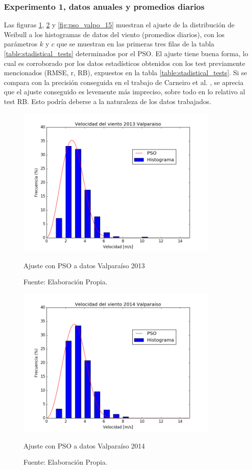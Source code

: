 \subsubsection{Experimento 1, datos anuales y promedios diarios}
Las figuras \ref{fig:pso_valpo_13}, \ref{fig:pso_valpo_14} y \ref{fig:pso_valpo_15} muestran el ajuste de la distribución de Weibull a los histogramas de datos del viento (promedios diarios), con los parámetros $k$ y $c$  que se muestran en las primeras tres filas de la tabla \ref{table:stadistical_tests} determinados por el PSO. El ajuste tiene buena forma, lo cual es corroborado por los datos estadísticos obtenidos con los test previamente mencionados (RMSE, r, RB), expuestos en la tabla \ref{table:stadistical_tests}. Si se compara con la precisión conseguida en el trabajo de Carneiro et al. \cite{Carneiro15}, se aprecia que el ajuste conseguido es levemente más impreciso, sobre todo en lo relativo al test RB. Esto podría deberse a la naturaleza de los datos 
trabajados.\\
\begin{figure}[H]
    \centering
    \includegraphics[height=75mm]{figures/result_2013.png}
    \caption{Ajuste con PSO a datos Valparaíso 2013}
    \vspace{-.25cm}
    \caption*{Fuente: Elaboración Propia.}
    \label{fig:pso_valpo_13}
\end{figure}
\begin{figure}[H]
    \centering
    \includegraphics[height=75mm]{figures/result_2014.png}
    \caption{Ajuste con PSO a datos Valparaíso 2014}
    \vspace{-.25cm}
    \caption*{Fuente: Elaboración Propia.}
    \label{fig:pso_valpo_14}
\end{figure}

